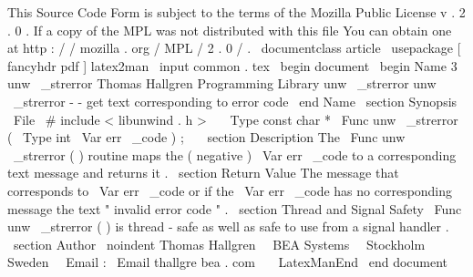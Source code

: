 %
This
Source
Code
Form
is
subject
to
the
terms
of
the
Mozilla
Public
%
License
v
.
2
.
0
.
If
a
copy
of
the
MPL
was
not
distributed
with
this
%
file
You
can
obtain
one
at
http
:
/
/
mozilla
.
org
/
MPL
/
2
.
0
/
.
\
documentclass
{
article
}
\
usepackage
[
fancyhdr
pdf
]
{
latex2man
}
\
input
{
common
.
tex
}
\
begin
{
document
}
\
begin
{
Name
}
{
3
}
{
unw
\
_strerror
}
{
Thomas
Hallgren
}
{
Programming
Library
}
{
unw
\
_strerror
}
unw
\
_strerror
-
-
get
text
corresponding
to
error
code
\
end
{
Name
}
\
section
{
Synopsis
}
\
File
{
\
#
include
<
libunwind
.
h
>
}
\
\
\
Type
{
const
char
*
}
\
Func
{
unw
\
_strerror
}
(
\
Type
{
int
}
\
Var
{
err
\
_code
}
)
;
\
\
\
section
{
Description
}
The
\
Func
{
unw
\
_strerror
}
(
)
routine
maps
the
(
negative
)
\
Var
{
err
\
_code
}
to
a
corresponding
text
message
and
returns
it
.
\
section
{
Return
Value
}
The
message
that
corresponds
to
\
Var
{
err
\
_code
}
or
if
the
\
Var
{
err
\
_code
}
has
no
corresponding
message
the
text
"
invalid
error
code
"
.
\
section
{
Thread
and
Signal
Safety
}
\
Func
{
unw
\
_strerror
}
(
)
is
thread
-
safe
as
well
as
safe
to
use
from
a
signal
handler
.
\
section
{
Author
}
\
noindent
Thomas
Hallgren
\
\
BEA
Systems
\
\
Stockholm
Sweden
\
\
Email
:
\
Email
{
thallgre
bea
.
com
}
\
\
\
LatexManEnd
\
end
{
document
}
